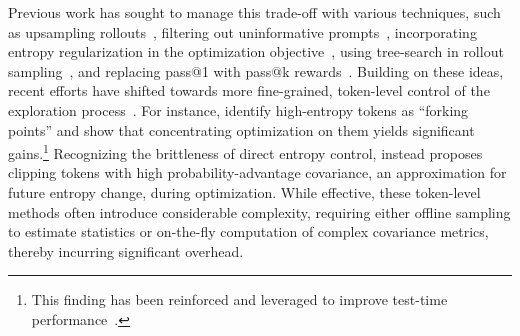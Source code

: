 \documentclass{article} %
\begin{document}
Previous work has sought to manage this trade-off with various techniques, such as upsampling rollouts~\citep{hou2025t1}, filtering out uninformative prompts~\citep{yu2025dapo}, incorporating entropy regularization in the optimization objective~\citep{agarwal2025unreasonable, cheng2025reasoning}, using tree-search in rollout sampling~\citep{li2025treepo}, and replacing pass@1 with pass@k rewards~\citep{chen2025pass}.
%
Building on these ideas, recent efforts have shifted towards more fine-grained, token-level control of the exploration process~\citep{wang2025beyond, cui2025entropy}.
%
For instance, \citet{wang2025beyond} identify high-entropy tokens as ``forking points'' and show that concentrating optimization on them yields significant gains.\footnote{This finding has been reinforced and leveraged to improve test-time performance~\citep{fu2025deep}.}
%
Recognizing the brittleness of direct entropy control, \citet{cui2025entropy} instead proposes clipping tokens with high probability-advantage covariance, an approximation for future entropy change, during optimization.
%
While effective, these token-level methods often introduce considerable complexity, requiring either offline sampling to estimate statistics or on-the-fly computation of complex covariance metrics, thereby incurring significant overhead.
%


\end{document}
